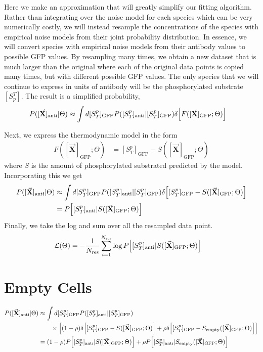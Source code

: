 \documentclass[aps,onecolumn,superscriptaddress,notitlepage]{revtex4-1}
\newcommand{\vbX}{\vec{\mathbf{X}}}
\begin{document}
Here we make an approximation that will greatly simplify our fitting algorithm. 
Rather than integrating over the noise model for each species which can be very numerically costly, we will instead resample the concentrations of the species with empirical noise models from their joint probability distribution.
In essence, we will convert species with empirical noise models from their antibody values to possible GFP values.
By resampling many times, we obtain a new dataset that is much larger than the original where each of the original data points is copied many times, but with different possible GFP values. The only species that we will continue to express in units of antibody will be the phosphorylated substrate $[S_p^T]$.
The result is a simplified probability,
\begin{align}
P([\vbX]_{\mathrm{anti}} | \Theta ) &\approx   \int d [S_T^p]_{\mathrm{GFP}} P\qty( [S_T^p]_{\mathrm{anti}} |  [S_T^p]_{\mathrm{GFP}})\delta\qty[F([\vbX]_{\mathrm{GFP}};\Theta)]
\end{align}

Next, we express the thermodynamic model in the form
\begin{align}
F([\vbX]_{\mathrm{GFP}};\Theta) &= [S_T^p]_{\mathrm{GFP}} - S([\vbX]_{\mathrm{GFP}};\Theta)
\end{align}
where $S$ is the amount of phosphorylated substrated predicted by the model.
Incorporating this we get
\begin{align}
P([\vbX]_{\mathrm{anti}} | \Theta ) &\approx   \int d[S_T^p]_{\mathrm{GFP}} P\qty([S_T^p]_{\mathrm{anti}} |  [S_T^p]_{\mathrm{GFP}})\delta\qty[[S_T^p]_{\mathrm{GFP}} - S([\vbX]_{\mathrm{GFP}};\Theta)]\\
&=   P\qty[ [S_T^p]_{\mathrm{anti}} |  S([\vbX]_{\mathrm{GFP}};\Theta)]
\end{align} 
Finally, we take the log and sum over all the resampled data point.
\begin{align}
\mathcal{L}(\Theta) &= -\frac{1}{N_{\mathrm{res}}}\sum_{i=1}^{N_{\mathrm{res}}}\log P\qty[ [S_T^p]_{\mathrm{anti}} |  S([\vbX]_{\mathrm{GFP}};\Theta)]
\end{align}

\section{Empty Cells}

\begin{align}
P([\vbX]_{\mathrm{anti}} | \Theta ) &\approx   \int d [S_T^p]_{\mathrm{GFP}} P\qty( [S_T^p]_{\mathrm{anti}} |  [S_T^p]_{\mathrm{GFP}})\\
&\qquad \times\qty[(1-\rho)\delta\qty[[S_T^p]_{\mathrm{GFP}} - S([\vbX]_{\mathrm{GFP}};\Theta)]+\rho\delta\qty[[S_T^p]_{\mathrm{GFP}} - S_{\mathrm{empty}}([\vbX]_{\mathrm{GFP}};\Theta)]]\\
&=  (1-\rho) P\qty[ [S_T^p]_{\mathrm{anti}} |  S([\vbX]_{\mathrm{GFP}};\Theta)] +  \rho P\qty[ [S_T^p]_{\mathrm{anti}} |  S_{\mathrm{empty}}([\vbX]_{\mathrm{GFP}};\Theta)]
\end{align} 
\end{document}
